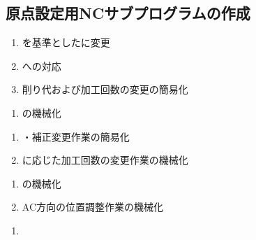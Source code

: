 \subsection{原点設定用NCサブプログラムの作成\TBW}



\begin{enumerate}[label=\sarrow]
\item \IDCenter を基準とした\EndFacecutMilling に変更
\item \ODCornerR への対応
\item {}削り代および加工回数の変更の簡易化
\end{enumerate}



\begin{enumerate}[label=\sarrow]
\item \CurvedOutcutMilling の機械化
\end{enumerate}



\begin{enumerate}[label=\sarrow]
\item \KeywayPos・\KeywayWidth 補正変更作業の簡易化
\item \KeywayWidth に応じた加工回数の変更作業の機械化
\end{enumerate}



\begin{enumerate}[label=\sarrow]
\item \EndFaceChamferMilling の機械化
\item AC方向の位置調整作業の機械化
\end{enumerate}



\begin{enumerate}[label=\sarrow]
\item
\end{enumerate}


